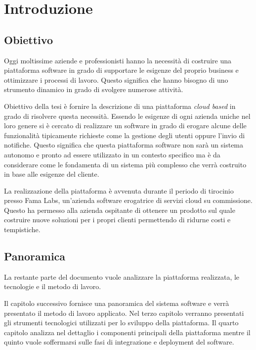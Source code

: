 \chapter{Introduzione}
\section{Obiettivo}
Oggi moltissime aziende e professionisti hanno la necessità di costruire
una piattaforma software in grado di supportare le esigenze del proprio business e
ottimizzare i processi di lavoro. Questo significa che hanno bisogno di uno strumento dinamico
in grado di svolgere numerose attività.

Obiettivo della tesi è fornire la descrizione di una piattaforma \textit{cloud based} in grado di risolvere questa necessità.
Essendo le esigenze di ogni azienda uniche nel loro genere si è cercato di realizzare un software in grado
di erogare alcune delle funzionalità tipicamente richieste come la gestione degli utenti oppure l'invio di notifiche.
Questo significa che questa piattaforma software non sarà un sistema autonomo e pronto ad essere utilizzato in un contesto specifico ma
è da considerare come le fondamenta di un sistema più complesso che verrà costruito in base alle esigenze del cliente.

La realizzazione della piattaforma è avvenuta durante il periodo di tirocinio presso Fama Labs,
un'azienda software erogatrice di servizi cloud su commissione.
Questo ha permesso alla azienda ospitante di ottenere un prodotto sul quale costruire nuove soluzioni per i propri clienti
permettendo di ridurne costi e tempistiche.

\section{Panoramica}
La restante parte del documento vuole analizzare la piattaforma realizzata, le tecnologie e il metodo di lavoro.

Il capitolo successivo fornisce una panoramica del sistema software
e verrà presentato il metodo di lavoro applicato. Nel terzo capitolo verranno presentati
gli strumenti tecnologici utilizzati per lo sviluppo della piattaforma. Il quarto capitolo
analizza nel dettaglio i componenti principali della piattaforma mentre il quinto
vuole soffermarsi sulle fasi di integrazione e deployment del software.
